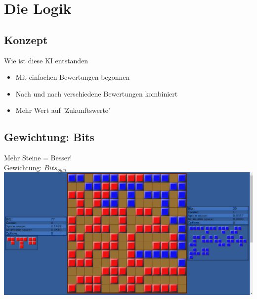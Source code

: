 \documentclass[12pt]{beamer}
\begin{document}
\section{Die Logik}
\subsection{Konzept}
\begin{frame}
	Wie ist diese KI entstanden
	\pause
	\begin{itemize}[<+(1)->]
		\item Mit einfachen Bewertungen begonnen
		\item Nach und nach verschiedene Bewertungen kombiniert
		\item Mehr Wert auf 'Zukunftswerte'
    \end{itemize}
\end{frame}

\subsection{Gewichtung: Bits}
\begin{frame}
	Mehr Steine = Besser!\\
	\pause
	Gewichtung: $Bits_{own}$\\
	\pause
	\includegraphics[width=\linewidth]{media/wgh1.png}
\end{frame}
\end{document}
